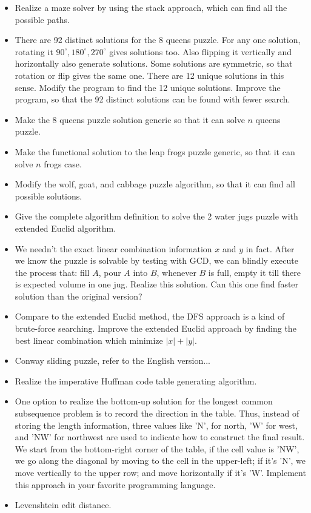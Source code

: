 \documentclass[UTF8]{article}
\begin{document}
\begin{Exercise}
\begin{itemize}
\item Realize a maze solver by using the stack approach, which can find all the possible paths.
\item There are 92 distinct solutions for the 8 queens puzzle. For any one solution, rotating it
$90^{\circ}, 180^{\circ}, 270^{\circ}$ gives solutions too. Also flipping it vertically and horizontally
also generate solutions. Some solutions are symmetric, so that rotation or flip gives the same one.
There are 12 unique solutions in this sense. Modify the program to find the 12 unique solutions.
Improve the program, so that the 92 distinct solutions can be found with fewer search.
\item Make the 8 queens puzzle solution generic so that it can solve $n$ queens puzzle.
\item Make the functional solution to the leap frogs puzzle generic, so that it can solve $n$
frogs case.
\item Modify the wolf, goat, and cabbage puzzle algorithm, so that it can find all possible
solutions.
\item Give the complete algorithm definition to solve the 2 water jugs puzzle with extended
Euclid algorithm.
\item We needn't the exact linear combination information $x$ and $y$ in fact. After we know
the puzzle is solvable by testing with GCD, we can blindly execute the process that:
fill $A$, pour $A$ into $B$, whenever $B$ is full, empty it till there is expected volume
in one jug. Realize this solution. Can this one find faster solution than the original
version?
\item Compare to the extended Euclid method, the DFS approach is a kind of brute-force searching.
Improve the extended Euclid approach by finding the best linear combination which minimize
$|x| + |y|$.
\item Conway sliding puzzle, refer to the English version...
\item Realize the imperative Huffman code table generating algorithm.
\item One option to realize the bottom-up solution for the longest common subsequence problem
is to record the direction in the table. Thus, instead of storing the length information,
three values like 'N', for north, 'W' for west, and 'NW' for northwest are used to indicate
how to construct the final result. We start from the bottom-right corner of the table, if
the cell value is 'NW', we go along the diagonal by moving to the cell in the upper-left;
if it's 'N', we move vertically to the upper row; and move horizontally if it's 'W'.
Implement this approach in your favorite programming language.
\item Levenshtein edit distance.
\end{itemize}
\end{Exercise}
\end{document}
